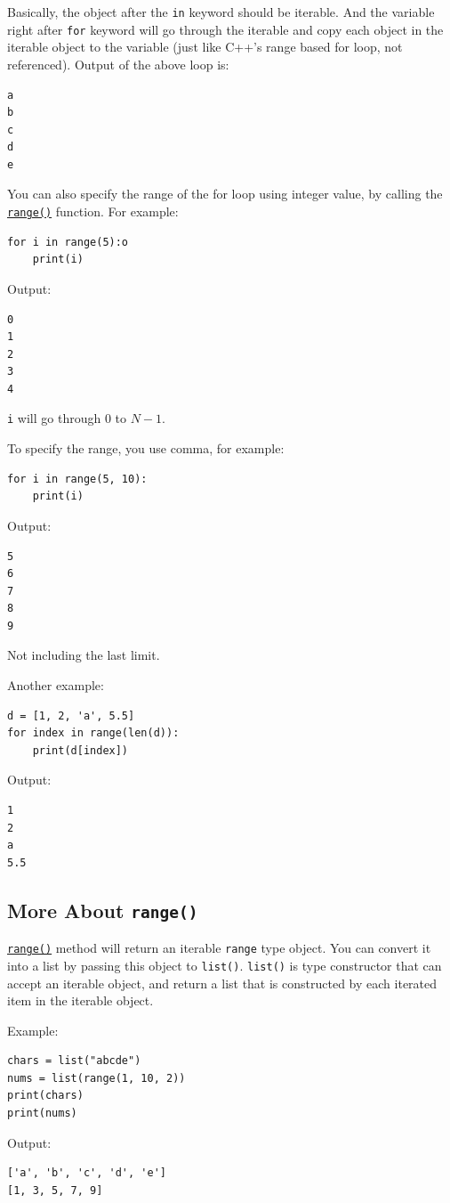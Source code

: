 \documentclass[12pt]{book}
\begin{document}
Basically, the object after the \texttt{in} keyword should be iterable. And the variable right after \texttt{for} keyword will go through the iterable and copy each object in the iterable object to the variable (just like C++'s range based for loop, not referenced). Output of the above loop is:
\begin{verbatim}
a
b
c
d
e
\end{verbatim}

You can also specify the range of the for loop using integer value, by calling the \href{https://docs.python.org/3/library/stdtypes.html\#range}{\texttt{range()}} function. For example:
\begin{verbatim}
for i in range(5):o
    print(i)
\end{verbatim}
Output:
\begin{verbatim}
0
1
2
3
4
\end{verbatim}
\texttt{i} will go through \(0\) to \(N - 1\).

To specify the range, you use comma, for example:
\begin{verbatim}
for i in range(5, 10):
    print(i)
\end{verbatim}
Output:
\begin{verbatim}
5
6
7
8
9
\end{verbatim}
Not including the last limit.

Another example:
\begin{verbatim}
d = [1, 2, 'a', 5.5]
for index in range(len(d)):
    print(d[index])
\end{verbatim}
Output:
\begin{verbatim}
1
2
a
5.5
\end{verbatim}
\subsection{More About \texttt{range()}}
\label{sec:org7c52c79}
\href{https://docs.python.org/3/library/stdtypes.html\#range}{\texttt{range()}} method will return an iterable \texttt{range} type object. You can convert it into a list by passing this object to \texttt{list()}. \texttt{list()} is type constructor that can accept an iterable object, and return a list that is constructed by each iterated item in the iterable object.

Example:
\begin{verbatim}
chars = list("abcde")
nums = list(range(1, 10, 2))
print(chars)
print(nums)
\end{verbatim}
Output:
\begin{verbatim}
['a', 'b', 'c', 'd', 'e']
[1, 3, 5, 7, 9]
\end{verbatim}
\end{document}

